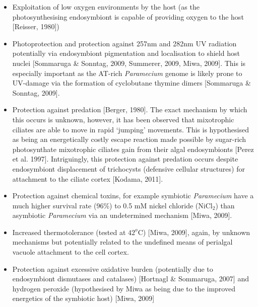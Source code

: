\documentclass[a4paper,11pt]{article}
\begin{document}
\begin{itemize}
  \item Exploitation of low oxygen environments by the host (as the photosynthesising endosymbiont is capable of providing oxygen to the host [Reisser, 1980])
  \item Photoprotection and protection against 257nm and 282nm UV radiation potentially via endosymbiont pigmentation and localisation to shield host nuclei [Sommaruga \& Sonntag, 2009, Summerer, 2009, Miwa, 2009].  This is especially important as the AT-rich \textit{Paramecium} genome is likely prone to UV-damage via the formation of cyclobutane thymine dimers [Sommaruga \& Sonntag, 2009].
  \item Protection against predation [Berger, 1980]. The exact mechanism by which this occurs is unknown, however, it has been observed that mixotrophic ciliates are able to move in rapid `jumping' movements. This is hypothesised as being an energetically costly escape reaction made possible by sugar-rich photosynthate mixotrophic ciliates gain from their algal endosymbionts [Perez et al. 1997]. Intriguingly, this protection against predation occurs despite endosymbiont displacement of trichocysts (defensive cellular structures) for attachment to the ciliate cortex [Kodama, 2011].
  \item Protection against chemical toxins, for example symbiotic \textit{Paramecium} have a much higher survival rate (96\%) to 0.5 mM nickel chloride (NiCl$_{2}$) than asymbiotic \textit{Paramecium} via an undetermined mechanism [Miwa, 2009].
  \item Increased thermotolerance (tested at $42^{o}$C) [Miwa, 2009], again, by unknown mechanisms but potentially related to the undefined means of perialgal vacuole attachment to the cell cortex.
  \item Protection against excessive oxidative burden (potentially due to endosymbiont dismutases and catalases) [Hortnagl \& Sommaruga, 2007] and hydrogen peroxide (hypothesised by Miwa as being due to the improved energetics of the symbiotic host) [Miwa, 2009]
\end{itemize}
\end{document}
